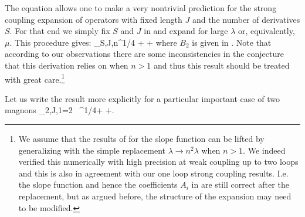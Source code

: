 The equation  allows one to
make a very nontrivial prediction for the strong coupling
expansion of operators with fixed length $J$ and
the number of derivatives $S$. For that end we simply fix $S$ and $J$ in 
and expand for large $\lambda$ or, equivalently, $\mu$. This procedure gives:
\beq
\Delta_{S,J,n}\simeq{}\mu^{1/4}
+
+\;
\eeq
where $B_2$ is given in .
Note that according to our observations there are some inconsistencies in the conjecture that this derivation relies on when $n>1$ and thus this result should be treated with great care.\footnote{We assume that the results of \cite{Basso:2011rs} for the slope function
can be lifted by generalizing with the simple replacement $\lambda\to n^2\lambda$ when $n>1$. 
We indeed verified this numerically with high precision at weak coupling up to two loops and this is also in agreement
with our one loop strong coupling results. I.e. the slope function and hence the coefficients $A_i$ in  are still correct after the replacement, but as argued before, the structure of the expansion  may need to be modified.}

Let us write the result more explicitly for a particular important case of two magnons
\beq
\Delta_{2,J,1}=2 \, \lambda^{1/4}+
+\;.
\eeq


